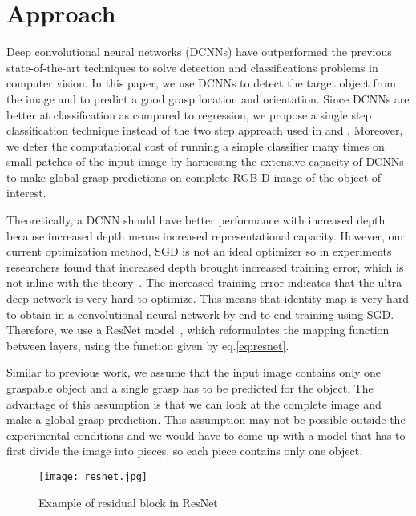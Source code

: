 \documentclass[10pt,twocolumn,letterpaper]{article}
\begin{document}
\section{Approach}
Deep convolutional neural networks (DCNNs) have outperformed the previous state-of-the-art techniques to solve detection and classifications problems in computer vision. In this paper, we use DCNNs to detect the target object from the image and to predict a good grasp location and orientation. Since DCNNs are better at classification as compared to regression, we propose a single step classification technique instead of the two step approach used in \cite{lenz2015deep} and \cite{Redmon}. Moreover, we deter the computational cost of running a simple classifier many times on small patches of the input image by harnessing the extensive capacity of DCNNs to make global grasp predictions on complete RGB-D image of the object of interest.

Theoretically, a DCNN should have better performance with increased depth because increased depth means increased representational capacity. However, our current optimization method, SGD is not an ideal optimizer so in experiments researchers found that increased depth brought increased training error, which is not inline with the theory~\cite{he2015deep}. The increased training error indicates that the ultra-deep network is very hard to optimize. This means that identity map is very hard to obtain in a convolutional neural network by end-to-end training using SGD. Therefore, we use a ResNet model~\cite{he2015deep}, which reformulates the mapping function between layers, using the function given by eq.\eqref{eq:resnet}.

Similar to previous work, we assume that the input image contains only one graspable object and a single grasp has to be predicted for the object. The advantage of this assumption is that we can look at the complete image and make a global grasp prediction. This assumption may not be possible outside the experimental conditions and we would have to come up with a model that has to first divide the image into pieces, so each piece contains only one object.

\begin{figure}
\begin{center}
\texttt{[image: resnet.jpg]}
\end{center}
   \caption{Example of residual block in ResNet}
\label{fig:resnet}
\end{figure}
\end{document}
